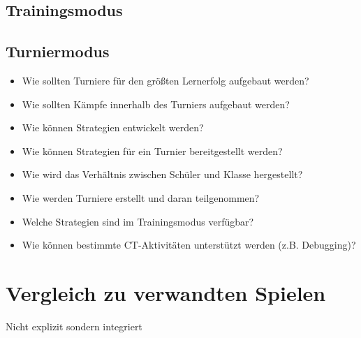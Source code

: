 \subsection{Trainingsmodus}


\subsection{Turniermodus}

\begin{itemize}
\item Wie sollten Turniere für den größten Lernerfolg aufgebaut werden?
\item Wie sollten Kämpfe innerhalb des Turniers aufgebaut werden?
\item Wie können Strategien entwickelt werden?
\item Wie können Strategien für ein Turnier bereitgestellt werden?
\item Wie wird das Verhältnis zwischen Schüler und Klasse hergestellt?
\item Wie werden Turniere erstellt und daran teilgenommen?
\item Welche Strategien sind im Trainingsmodus verfügbar?
\item Wie können bestimmte CT-Aktivitäten unterstützt werden (z.B. Debugging)?
\end{itemize}

\section{Vergleich zu verwandten Spielen}

Nicht explizit sondern integriert
